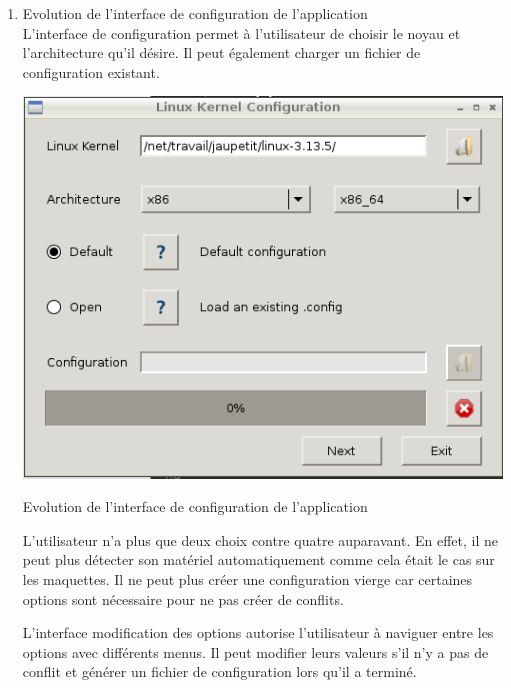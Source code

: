 \documentclass[16pts]{report}
\begin{document}
\begin{enumerate}

	\item Evolution de l'interface de configuration de l'application
	\\

	L'interface de configuration permet à l'utilisateur de choisir le noyau 
	et l'architecture qu'il désire. Il peut également charger un fichier de 
	configuration existant.

	\includegraphics[scale=0.5]{illustrations/screen_configuration_interface.png}
	\centering
	\caption{Evolution de l'interface de configuration de l'application}
	\label{fig:Evo_config}

	L'utilisateur n'a plus que deux choix contre quatre auparavant. En effet, 
	il ne peut plus détecter son matériel automatiquement comme cela était 
	le cas sur les maquettes. Il ne peut plus créer une configuration vierge 
	car certaines options sont nécessaire pour ne pas créer de conflits.


	L'interface modification des options autorise l'utilisateur à naviguer 
	entre les options avec différents menus. Il peut modifier leurs valeurs 
	s'il n'y a pas de conflit et générer un fichier de configuration lors 
	qu'il a terminé.


\end{enumerate}
\end{document}
